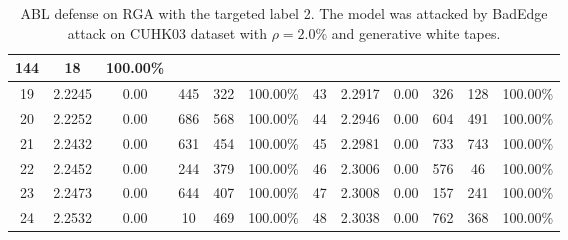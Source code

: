 \begin{table}[htbp]
\begin{minipage}[b]{0.45\linewidth}
{\begin{tabular}{cccccccccccc}
  \multicolumn{1}{c|}{144} &
  \multicolumn{1}{c|}{18} &
  100.00\% \\ \hline
\multicolumn{1}{c|}{19} &
  \multicolumn{1}{c|}{2.2245} &
  \multicolumn{1}{c|}{0.00} &
  \multicolumn{1}{c|}{445} &
  \multicolumn{1}{c|}{322} &
  \multicolumn{1}{c|}{100.00\%} &
  \multicolumn{1}{c|}{43} &
  \multicolumn{1}{c|}{2.2917} &
  \multicolumn{1}{c|}{0.00} &
  \multicolumn{1}{c|}{326} &
  \multicolumn{1}{c|}{128} &
  100.00\% \\ \hline
\multicolumn{1}{c|}{20} &
  \multicolumn{1}{c|}{2.2252} &
  \multicolumn{1}{c|}{0.00} &
  \multicolumn{1}{c|}{686} &
  \multicolumn{1}{c|}{568} &
  \multicolumn{1}{c|}{100.00\%} &
  \multicolumn{1}{c|}{44} &
  \multicolumn{1}{c|}{2.2946} &
  \multicolumn{1}{c|}{0.00} &
  \multicolumn{1}{c|}{604} &
  \multicolumn{1}{c|}{491} &
  100.00\% \\ \hline
\multicolumn{1}{c|}{21} &
  \multicolumn{1}{c|}{2.2432} &
  \multicolumn{1}{c|}{0.00} &
  \multicolumn{1}{c|}{631} &
  \multicolumn{1}{c|}{454} &
  \multicolumn{1}{c|}{100.00\%} &
  \multicolumn{1}{c|}{45} &
  \multicolumn{1}{c|}{2.2981} &
  \multicolumn{1}{c|}{0.00} &
  \multicolumn{1}{c|}{733} &
  \multicolumn{1}{c|}{743} &
  100.00\% \\ \hline
\multicolumn{1}{c|}{22} &
  \multicolumn{1}{c|}{2.2452} &
  \multicolumn{1}{c|}{0.00} &
  \multicolumn{1}{c|}{244} &
  \multicolumn{1}{c|}{379} &
  \multicolumn{1}{c|}{100.00\%} &
  \multicolumn{1}{c|}{46} &
  \multicolumn{1}{c|}{2.3006} &
  \multicolumn{1}{c|}{0.00} &
  \multicolumn{1}{c|}{576} &
  \multicolumn{1}{c|}{46} &
  100.00\% \\ \hline
\multicolumn{1}{c|}{23} &
  \multicolumn{1}{c|}{2.2473} &
  \multicolumn{1}{c|}{0.00} &
  \multicolumn{1}{c|}{644} &
  \multicolumn{1}{c|}{407} &
  \multicolumn{1}{c|}{100.00\%} &
  \multicolumn{1}{c|}{47} &
  \multicolumn{1}{c|}{2.3008} &
  \multicolumn{1}{c|}{0.00} &
  \multicolumn{1}{c|}{157} &
  \multicolumn{1}{c|}{241} &
  100.00\% \\ \hline
\multicolumn{1}{c|}{24} &
  \multicolumn{1}{c|}{2.2532} &
  \multicolumn{1}{c|}{0.00} &
  \multicolumn{1}{c|}{10} &
  \multicolumn{1}{c|}{469} &
  \multicolumn{1}{c|}{100.00\%} &
  \multicolumn{1}{c|}{48} &
  \multicolumn{1}{c|}{2.3038} &
  \multicolumn{1}{c|}{0.00} &
  \multicolumn{1}{c|}{762} &
  \multicolumn{1}{c|}{368} &
  100.00\% \\ \bottomrule
\end{tabular}}
  \caption{ABL defense on RGA with the targeted label 2. The model was attacked by BadEdge attack on CUHK03 dataset with $\rho=2.0\%$ and generative white tapes. }

\end{minipage}
\end{table}
